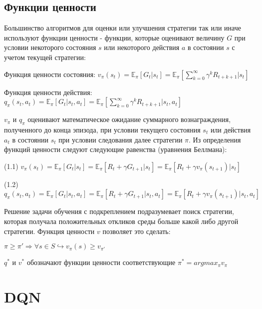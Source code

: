 \documentclass{mipt-thesis-bs}
\begin{document}


\section{Функции ценности}

Большинство алгоритмов для оценки или улучшения стратегии так или иначе используют функции ценности - функции, которые оценивают величину $G$ при условии некоторого состояния $s$ или некоторого действия $a$ в состоянии $s$ с учетом текущей стратегии:

Функция ценности состояния: $v_{\pi}(s_t) = \mathbb{E}_{\pi}[G_{t} | s_t]=\mathbb{E}_{\pi}[\sum_{k=0}^{\infty} \gamma^{k} R_{t+k+1} | s_t]$ 
 
Функция ценности действия: $q_{\pi}(s_t, a_t) = \mathbb{E}_{\pi}[G_{t} | s_{t}, a_{t}]=\mathbb{E}_{\pi}[\sum_{k=0}^{\infty} \gamma^{k} R_{t+k+1} | s_{t}, a_{t}]$

$v_\pi$ и $q_\pi$ оценивают математическое ожидание суммарного вознаграждения, полученного до конца эпизода, при условии текущего состояния $s_t$ или действия $a_t$ в состоянии $s_t$ при условии следования далее стратегии $\pi$. Из определения функций ценности следуют следующие равенства (уравнения Беллмана):
\begin{center}
(1.1) $v_{\pi}(s_t) = \mathbb{E}_{\pi}[G_t | s_t]=\mathbb{E}_{\pi}[R_{t} + \gamma G_{t+1}| s_t] = \mathbb{E}_{\pi}[R_{t} + \gamma v_{\pi}(s_{t+1})| s_t]$ 

(1.2) $q_{\pi}(s_t, a_t) = \mathbb{E}_{\pi}[G_{t} | s_t, a_t]=\mathbb{E}_{\pi}[R_{t} + \gamma G_{t+1}| s_t, a_t] = \mathbb{E}_{\pi}[R_{t} + \gamma v_{\pi}(s_{t+1})| s_t, a_t]$
\end{center}

Решение задачи обучения с подкреплением подразумевает поиск стратегии, которая получала положительных откликов среды больше какой либо другой стратегии. Функция ценности $v$ позволяет это сделать:

\begin{center}
    $\pi \geq \pi' \Rightarrow \forall s \in S \hookrightarrow v_\pi(s) \geq v_{\pi'}$
\end{center}

$q^*$ и $v^*$ обозначают функции ценности соответствующие $\pi^*= argmax_{\pi} v_\pi$

\chapter{DQN}
\end{document}
